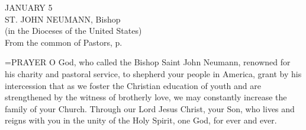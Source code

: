 \begin{center}\normalsize JANUARY 5\\
\footnotesize ST. JOHN NEUMANN, Bishop\\
\footnotesize (in the Dioceses of the United States)\\
\footnotesize From the common of Pastors, p. \\
\end{center}

\hangindent=\parindent \small{PRAYER 
O God, who called the Bishop Saint John Neumann,
renowned for his charity and pastoral service,
to shepherd your people in America,
grant by his intercession
that as we foster the Christian education of youth
and are strengthened by the witness of brotherly love,
we may constantly increase the family of your Church.
Through our Lord Jesus Christ, your Son,
who lives and reigns with you in the unity of the Holy Spirit,
one God, for ever and ever.\\}
 
 

